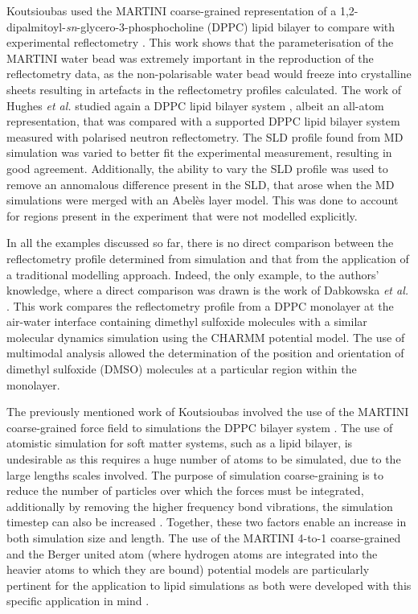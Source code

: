 Koutsioubas used the MARTINI coarse-grained representation of a 1,2-dipalmitoyl-\emph{sn}-glycero-3-phosphocholine (DPPC) lipid bilayer to compare with experimental reflectometry \cite{koutsioubas_combined_2016}.
This work shows that the parameterisation of the MARTINI water bead was extremely important in the reproduction of the reflectometry data, as the non-polarisable water bead would freeze into crystalline sheets resulting in artefacts in the reflectometry profiles calculated.
The work of Hughes \emph{et al.} studied again a DPPC lipid bilayer system \cite{hughes_interpretation_2016}, albeit an all-atom representation, that was compared with a supported DPPC lipid bilayer system measured with polarised neutron reflectometry.
The SLD profile found from MD simulation was varied to better fit the experimental measurement, resulting in good agreement.
Additionally, the ability to vary the SLD profile was used to remove an annomalous difference present in the SLD, that arose when the MD simulations were merged with an Abel\`{e}s layer model.
This was done to account for regions present in the experiment that were not modelled explicitly.

In all the examples discussed so far, there is no direct comparison between the reflectometry profile determined from simulation and that from the application of a traditional modelling approach.
Indeed, the only example, to the authors' knowledge, where a direct comparison was drawn is the work of Dabkowska \emph{et al.} \cite{dabkowska_modulation_2014}.
This work compares the reflectometry profile from a DPPC monolayer at the air-water interface containing dimethyl sulfoxide molecules with a similar molecular dynamics simulation using the CHARMM potential model.
The use of multimodal analysis allowed the determination of the position and orientation of dimethyl sulfoxide (DMSO) molecules at a particular region within the monolayer.

The previously mentioned work of Koutsioubas involved the use of the MARTINI coarse-grained force field to simulations the DPPC bilayer system \cite{koutsioubas_combined_2016}.
The use of atomistic simulation for soft matter systems, such as a lipid bilayer, is undesirable as this requires a huge number of atoms to be simulated, due to the large lengths scales involved.
The purpose of simulation coarse-graining is to reduce the number of particles over which the forces must be integrated, additionally by removing the higher frequency bond vibrations, the simulation timestep can also be increased \cite{pluhackova_biomembranes_2015}.
Together, these two factors enable an increase in both simulation size and length.
The use of the MARTINI 4-to-1 coarse-grained and the Berger united atom (where hydrogen atoms are integrated into the heavier atoms to which they are bound) potential models are particularly pertinent for the application to lipid simulations as both were developed with this specific application in mind \cite{marrink_martini_2007,berger_molecular_1997}.

